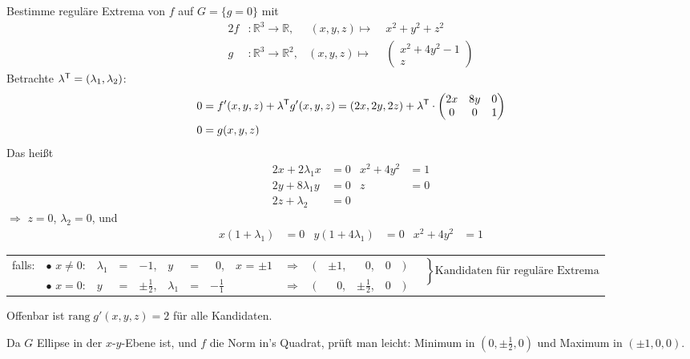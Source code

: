 \begin{example}
	Bestimme reguläre Extrema von $f$ auf $G=\{ g=0\}$ mit
	\begin{alignat*}{2}
		f&:\mathbb{R}^3\to\mathbb{R},&\, (x,y,z) \mapsto\;&x^2 + y^2 + z^2 \\
		g&:\mathbb{R}^3\to\mathbb{R}^2,& (x,y,z) \mapsto& \begin{pmatrix}
	x^2 + 4y^2 - 1 \\ z
	\end{pmatrix}
	\end{alignat*}
	Betrachte $\lambda^\mathsf{T} = (\lambda_1,\lambda_2)$: \begin{align}
		0 &= f'(x,y,z) + \lambda^\mathsf{T}g'(x,y,z) = (2x, 2y, 2z) + \lambda^\mathsf{T}\cdot\begin{pmatrix}
			2x & 8y & 0 \\ 0 & 0 & 1
		\end{pmatrix} \\
		\notag 0 &= g(x,y,z)
	\end{align}
	Das heißt \begin{align*}
		2x + 2\lambda_1 x &= 0 & x^2 + 4y^2 &= 1 \\
		2y+8\lambda_1 y &= 0 & z &= 0 \\
		2z + \lambda_2 &= 0 & &
	\end{align*}
	$\Rightarrow$ $z=0$, $\lambda_2 = 0$, und \begin{align*}
		x(1 + \lambda_1) &= 0 & y(1 + 4\lambda_1) &= 0 & x^2 + 4y^2 &= 1
	\end{align*}
	\begin{tabularx}{\linewidth}{@{}r@{\ }l@{\ }l@{\ }c@{\ }r@{\ }l@{\ }c@{\ }r@{\ }l@{\ \ }c@{\ \ }r@{$\,$}r@{$\,$}r@{$\,$}r@{$\,$}lX}
	falls:& $\bullet$ $x\neq 0$:& $\lambda_1$ & = & $-1$, &$y$ & = & $0$, &$x$ = $\pm 1$ &$\Rightarrow$& $($ & $\pm1$, & 0, &0 & $)$ & \multirow{2}{*}{$\left.\phantom{\dfrac{1}{1}}\right\} \text{Kandidaten für reguläre Extrema}$} \\
    &	$\bullet$ $x = 0$:  & $y$ & = &$\pm\frac{1}{2}$, &$\lambda_1$ & = & $-\frac{1}{1}$& & $\Rightarrow$& $($ & 0,&$\pm\frac{1}{2}$, &0 &$)$	\end{tabularx}

	Offenbar ist $\mathrm{rang}\;g'(x,y,z)=2$ für alle Kandidaten.
	
	Da $G$ Ellipse in der $x$-$y$-Ebene ist, und $f$ die Norm in's Quadrat, prüft man leicht: Minimum in $(0,\pm\frac{1}{2},0)$ und Maximum in $(\pm 1,0,0)$.
\end{example}

